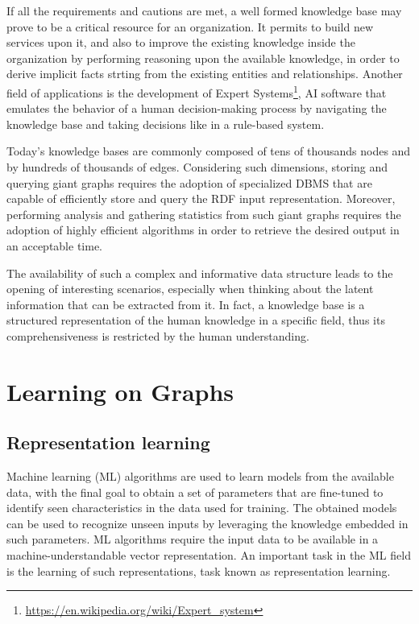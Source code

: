 \documentclass[%
    corpo=13.5pt,
    twoside,
    oldstyle,
    tipotesi=magistrale,
    greek,
    evenboxes
]{toptesi}
\begin{document}
If all the requirements and cautions are met, a well formed knowledge base may
prove to be a critical resource for an organization. It permits to
build new services upon it, and also to improve the existing knowledge inside
the organization by performing reasoning upon the available knowledge, in order
to derive implicit facts strting from the existing entities and relationships.
Another field of applications is the development of Expert Systems\footnote{\url{https://en.wikipedia.org/wiki/Expert_system}},
AI software that emulates the behavior of a human decision-making process by
navigating the knowledge base and taking decisions like in a rule-based system.

Today's knowledge bases are commonly composed of tens of
thousands nodes and by hundreds of thousands of edges.
Considering such dimensions, storing and querying giant graphs requires
the adoption of
specialized DBMS that are capable of efficiently store and query the RDF
input representation. Moreover, performing analysis and gathering statistics
from such giant graphs requires the adoption of highly efficient algorithms in
order to retrieve the desired output in an acceptable time.

The availability of such a complex and informative data structure leads
to the opening of interesting scenarios, especially when thinking about
the latent information that can be extracted from it. In
fact, a knowledge base is a structured representation of the
human knowledge in a specific field, thus its comprehensiveness is restricted
by the human understanding.


\section{Learning on Graphs}

\subsection{Representation learning}

Machine learning (ML) algorithms are used to learn models from the
available data, with the final goal to obtain a set of parameters
that are fine-tuned to identify seen characteristics in the data
used for training. The obtained models can be used to
recognize unseen inputs by leveraging the knowledge embedded
in such parameters.
ML algorithms require the input data to be available in a
machine-understandable vector representation. An important task
in the ML field is the learning of such representations, task known
as representation learning.
\end{document}
